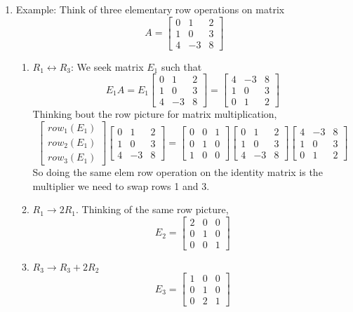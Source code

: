 \documentclass{article}
\begin{document}
\begin{enumerate}
\begin{enumerate}
\item Example: Think of three elementary row operations on matrix 
\[
A = \left[
\begin{array}{ccc}
0 & 1 & 2 \\
1 & 0 & 3 \\
4 & -3 & 8
\end{array}
\right]
\]
\begin{enumerate}
\item $R_1 \leftrightarrow R_3$: We seek matrix $E_1$ such that 
\[
E_1 A 
= E_1 \left[
\begin{array}{ccc}
0 & 1 & 2 \\
1 & 0 & 3 \\
4 & -3 & 8
\end{array}
\right]
= \left[
\begin{array}{ccc}
4 & -3 & 8 \\
1 & 0 & 3 \\
0 & 1 & 2 
\end{array}
\right]
\]
Thinking bout the row picture for matrix multiplication,
\[
\left[
\begin{array}{c}
row_1(E_1) \\
row_2(E_1) \\
row_3(E_1) 
\end{array}
\right]
\left[
\begin{array}{ccc}
0 & 1 & 2 \\
1 & 0 & 3 \\
4 & -3 & 8
\end{array}
\right] =  \left[
\begin{array}{ccc}
0 & 0 & 1 \\
0 & 1 & 0 \\
1 & 0 & 0  
\end{array}
\right]
\left[
\begin{array}{ccc}
0 & 1 & 2 \\
1 & 0 & 3 \\
4 & -3 & 8
\end{array}
\right]
 \left[
\begin{array}{ccc}
4 & -3 & 8 \\
1 & 0 & 3 \\
0 & 1 & 2 
\end{array}
\right]
\]
So doing the same elem row operation on the identity matrix is the multiplier we need to swap rows 1 and 3.
\item $R_1 \rightarrow 2 R_1$. Thinking of the same row picture,
\[
E_2 = \left[
\begin{array}{ccc}
2 & 0 & 0 \\
0 & 1 & 0 \\
0 & 0 & 1
\end{array}
\right]
\]
\item $R_3 \rightarrow R_3 + 2R_2$
\[
E_3 = \left[
\begin{array}{ccc}
1 & 0 & 0 \\
0 & 1 & 0 \\
0 & 2 & 1
\end{array}
\right]
\]
\end{enumerate}


\end{enumerate}
\end{enumerate}
\end{document}
